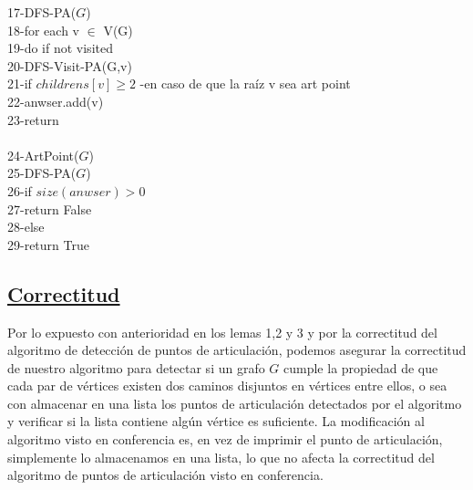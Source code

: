 \documentclass{article}
\begin{document}
\begin{algorithm}[H]
        17-\hspace*{1em}DFS-PA($G$)\\
        18-\hspace*{2em}for each v $\in$ V(G)\\
        19-\hspace*{3em}do if not visited\\
        20-\hspace*{4em}DFS-Visit-PA(G,v)\\
        21-\hspace*{4em}if $childrens[v] \ge 2$ -en caso de que la ra\'iz v  sea art point \\
        22-\hspace*{5em}anwser.add(v)\\
        23-\hspace*{2em}return \\\\
        24-\hspace*{1em}ArtPoint($G$)\\
        25-\hspace*{2em}DFS-PA($G$)\\
        26-\hspace*{2em}if $size(anwser) > 0$\\
        27-\hspace*{3em}return False\\
        28-\hspace*{2em}else\\
        29-\hspace*{3em}return True\\
                
    \end{algorithm}

    \subsection{\underline{Correctitud}} 
    Por lo expuesto con anterioridad en los lemas 1,2 y 3 y por la correctitud del algoritmo de detecci\'on de puntos de 
    articulaci\'on, podemos asegurar la correctitud de nuestro algoritmo para detectar si un grafo $G$ cumple la propiedad 
    de  que cada par de v\'ertices existen dos caminos disjuntos en v\'ertices entre ellos, o sea con almacenar en una lista
    los puntos de articulaci\'on detectados por el algoritmo y verificar si la lista contiene alg\'un v\'ertice es suficiente.
    La modificaci\'on al algoritmo visto en conferencia es, en vez de imprimir el punto de articulaci\'on, simplemente lo
    almacenamos en una lista, lo que no afecta la correctitud del algoritmo de puntos de articulaci\'on visto en conferencia. \\\\
\end{document}
